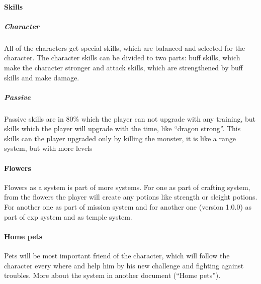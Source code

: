 \documentclass[parskip=full]{scrartcl}
\begin{document}
					\paragraph{Skills} \vspace{-5mm}
						\subparagraph{Character} \vspace{-5mm}
							\par \begingroup
							\leftskip=2cm
							\noindent
									All of the characters get special skills, which are balanced and selected for the character. The character skills can be divided to two parts: buff skills, which make the character stronger and attack skills, which are strengthened by buff skills and make damage. 
							\par \endgroup
						\subparagraph{Passive} \vspace{-5mm}
							\par \begingroup
							\leftskip=2cm
							\noindent
									Passive skills are in 80\% which the player can not upgrade with any training, but skills which the player will upgrade with the time, like “dragon strong”. This skills can the player upgraded only by killing the monster, it is like a range system, but with more levels
							\par \endgroup
					\paragraph{Flowers} \vspace{-5mm}
						\par \begingroup
						\leftskip=2cm
						\noindent
								Flowers as a system is part of more systems. For one as part of crafting system, from the flowers the player will create any potions like strength or sleight potions. For another one as part of mission system and for another one (version 1.0.0) as part of exp system and as temple system.
						\par \endgroup
					\paragraph{Home pets} \vspace{-5mm}
						\par \begingroup
						\leftskip=2cm
						\noindent
								Pets will be most important friend of the character, which will follow the character every where and help him by his new challenge and fighting against troubles. More about the system in another document (“Home pets”).
						\par \endgroup
\end{document}
